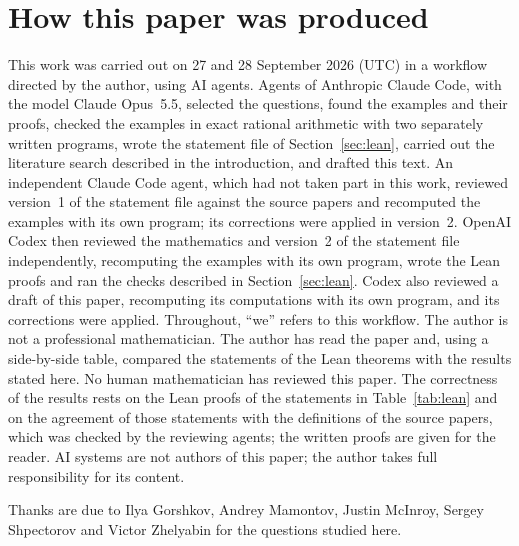 \documentclass[11pt]{article}
\newif\ifwithC
\theoremstyle{definition}
\theoremstyle{remark}
\begin{document}
\section*{How this paper was produced}
This work was carried out on 27 and 28 September 2026 (UTC) in a workflow
directed by the author, using AI agents. Agents of Anthropic Claude Code,
with the model Claude Opus~5.5, selected the questions, found the examples
and their proofs, checked the examples in exact rational arithmetic with two
separately written programs, wrote the statement file of
Section~\ref{sec:lean}, carried out the literature search described in the
introduction, and drafted this text. An independent Claude Code agent, which
had not taken part in this work, reviewed version~1 of the statement file
against the source papers and recomputed the examples with its own program;
its corrections were applied in version~2. OpenAI Codex then reviewed the
mathematics and version~2 of the statement file independently, recomputing
the examples with its own program, wrote the Lean proofs and ran the checks
described in Section~\ref{sec:lean}\ifwithC; it also wrote the two
supplementary statements of Section~\ref{sec:lean}, which an independent
Codex agent reviewed before they were frozen\fi. Codex also reviewed a draft
of this paper, recomputing its computations with its own program, and its
corrections were applied.
Throughout, ``we'' refers to this
workflow. The author is not a professional mathematician. The author has
read the paper and, using a side-by-side table, compared the statements of
the Lean theorems with the results stated here.
No human mathematician has reviewed this paper. The correctness of the
results rests on the Lean proofs of the statements in Table~\ref{tab:lean}
and on the agreement of those statements with the definitions of the source
papers, which was checked by the reviewing agents; the written proofs are
given for the reader. AI systems are not authors of this paper; the author
takes full responsibility for its content.

\medskip
\noindent Thanks are due to Ilya Gorshkov, Andrey Mamontov, Justin McInroy,
Sergey Shpectorov and Victor Zhelyabin for the questions studied here.
\end{document}
